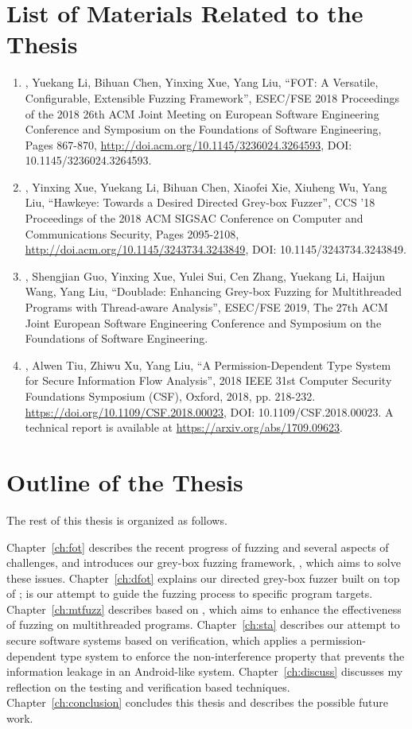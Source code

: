 \section{List of Materials Related to the Thesis}
\begin{enumerate}
	\item \myname, Yuekang Li, Bihuan Chen, Yinxing Xue, Yang Liu, ``FOT: A Versatile, Configurable, Extensible Fuzzing Framework'', ESEC/FSE 2018 Proceedings of the 2018 26th ACM Joint Meeting on European Software Engineering Conference and Symposium on the Foundations of Software Engineering, Pages 867-870, \url{http://doi.acm.org/10.1145/3236024.3264593}, DOI: 10.1145/3236024.3264593.
	\item \myname, Yinxing Xue, Yuekang Li, Bihuan Chen, Xiaofei Xie, Xiuheng Wu, Yang Liu, ``Hawkeye: Towards a Desired Directed Grey-box Fuzzer'', CCS '18 Proceedings of the 2018 ACM SIGSAC Conference on Computer and Communications Security, Pages 2095-2108, \url{http://doi.acm.org/10.1145/3243734.3243849}, DOI: 10.1145/3243734.3243849.
	\item \myname, Shengjian Guo, Yinxing Xue, Yulei Sui, Cen Zhang, Yuekang Li, Haijun Wang, Yang Liu, ``Doublade: Enhancing Grey-box Fuzzing for Multithreaded Programs with Thread-aware Analysis'', ESEC/FSE 2019, The 27th ACM Joint European Software Engineering Conference and Symposium on the Foundations of Software Engineering.
	\item \myname, Alwen Tiu, Zhiwu Xu, Yang Liu, ``A Permission-Dependent Type System for Secure Information Flow Analysis'', 2018 IEEE 31st Computer Security Foundations Symposium (CSF), Oxford, 2018, pp. 218-232. \url{https://doi.org/10.1109/CSF.2018.00023}, DOI: 10.1109/CSF.2018.00023. A technical report is available at \url{https://arxiv.org/abs/1709.09623}.
\end{enumerate}

\section{Outline of the Thesis}

The rest of this thesis is organized as follows.

Chapter~\ref{ch:fot} describes the recent progress of fuzzing and several aspects of challenges, and introduces our grey-box fuzzing framework, \FOT, which aims to solve these issues. Chapter~\ref{ch:dfot} explains our directed grey-box fuzzer \dFOT built on top of \FOT; \dFOT is our attempt to guide the fuzzing process to specific program targets. Chapter~\ref{ch:mtfuzz} describes \mtfuzz based on \FOT, which aims to enhance the effectiveness of fuzzing on multithreaded programs. Chapter~\ref{ch:sta} describes our attempt to secure software systems based on verification, which applies a permission-dependent type system to enforce the non-interference property that prevents the information leakage in an Android-like system. Chapter~\ref{ch:discuss} discusses my reflection on the testing and verification based techniques. Chapter~\ref{ch:conclusion} concludes this thesis and describes the possible future work.